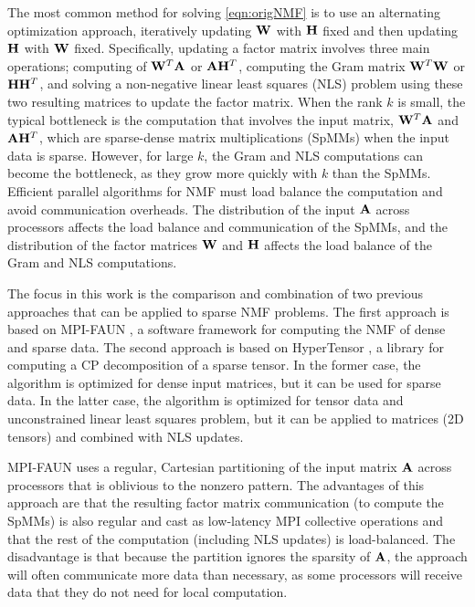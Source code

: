 The most common method for solving \cref{eqn:origNMF} is to use an alternating optimization approach, iteratively updating $\WW$ with $\HH$ fixed and then updating $\HH$ with $\WW$ fixed.
Specifically, updating a factor matrix involves three main operations; computing of $\WW^T\AA$ or $\AA\Hm^T$, computing the Gram matrix $\Wm^T \Wm$ or $\Hm \Hm^T$, and solving a non-negative linear least squares (NLS) problem using these two resulting matrices to update the factor matrix.
When the rank $k$ is small, the typical bottleneck is the computation that involves the input matrix, $\WW^T\AA$ and $\AA\Hm^T$, which are sparse-dense matrix multiplications (SpMMs) when the input data is sparse.
However, for large $k$, the Gram and NLS computations can become the bottleneck, as they grow more quickly with $k$ than the SpMMs.
Efficient parallel algorithms for NMF must load balance the computation and avoid communication overheads.
The distribution of the input $\AA$ across processors affects the load balance and communication of the SpMMs, and the distribution of the factor matrices $\WW$ and $\HH$ affects the load balance of the Gram and NLS computations.

The focus in this work is the comparison and combination of two previous approaches that can be applied to sparse NMF problems.
The first approach is based on MPI-FAUN \cite{KBP17}, a software framework for computing the NMF of dense and sparse data.
The second approach is based on HyperTensor \cite{KU15}, a library for computing a CP decomposition of a sparse tensor.
In the former case, the algorithm is optimized for dense input matrices, but it can be used for sparse data.
In the latter case, the algorithm is optimized for tensor data and unconstrained linear least squares problem, but it can be applied to matrices (2D tensors) and combined with NLS updates.

MPI-FAUN uses a regular, Cartesian partitioning of the input matrix $\AA$ across processors that is oblivious to the nonzero pattern.
The advantages of this approach are that the resulting factor matrix communication (to compute the SpMMs) is also regular and cast as low-latency MPI collective operations and that the rest of the computation (including NLS updates) is load-balanced.
The disadvantage is that because the partition ignores the sparsity of $\AA$, the approach will often communicate more data than necessary, as some processors will receive data that they do not need for local computation.

